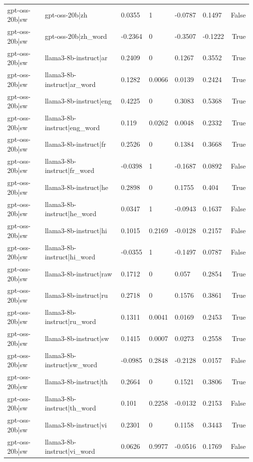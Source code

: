 \begin{table}
\begin{tabular}{llllllr}
gpt-oss-20b|sw & gpt-oss-20b|zh & 0.0355 & 1 & -0.0787 & 0.1497 & False \\
gpt-oss-20b|sw & gpt-oss-20b|zh_word & -0.2364 & 0 & -0.3507 & -0.1222 & True \\
gpt-oss-20b|sw & llama3-8b-instruct|ar & 0.2409 & 0 & 0.1267 & 0.3552 & True \\
gpt-oss-20b|sw & llama3-8b-instruct|ar_word & 0.1282 & 0.0066 & 0.0139 & 0.2424 & True \\
gpt-oss-20b|sw & llama3-8b-instruct|eng & 0.4225 & 0 & 0.3083 & 0.5368 & True \\
gpt-oss-20b|sw & llama3-8b-instruct|eng_word & 0.119 & 0.0262 & 0.0048 & 0.2332 & True \\
gpt-oss-20b|sw & llama3-8b-instruct|fr & 0.2526 & 0 & 0.1384 & 0.3668 & True \\
gpt-oss-20b|sw & llama3-8b-instruct|fr_word & -0.0398 & 1 & -0.1687 & 0.0892 & False \\
gpt-oss-20b|sw & llama3-8b-instruct|he & 0.2898 & 0 & 0.1755 & 0.404 & True \\
gpt-oss-20b|sw & llama3-8b-instruct|he_word & 0.0347 & 1 & -0.0943 & 0.1637 & False \\
gpt-oss-20b|sw & llama3-8b-instruct|hi & 0.1015 & 0.2169 & -0.0128 & 0.2157 & False \\
gpt-oss-20b|sw & llama3-8b-instruct|hi_word & -0.0355 & 1 & -0.1497 & 0.0787 & False \\
gpt-oss-20b|sw & llama3-8b-instruct|raw & 0.1712 & 0 & 0.057 & 0.2854 & True \\
gpt-oss-20b|sw & llama3-8b-instruct|ru & 0.2718 & 0 & 0.1576 & 0.3861 & True \\
gpt-oss-20b|sw & llama3-8b-instruct|ru_word & 0.1311 & 0.0041 & 0.0169 & 0.2453 & True \\
gpt-oss-20b|sw & llama3-8b-instruct|sw & 0.1415 & 0.0007 & 0.0273 & 0.2558 & True \\
gpt-oss-20b|sw & llama3-8b-instruct|sw_word & -0.0985 & 0.2848 & -0.2128 & 0.0157 & False \\
gpt-oss-20b|sw & llama3-8b-instruct|th & 0.2664 & 0 & 0.1521 & 0.3806 & True \\
gpt-oss-20b|sw & llama3-8b-instruct|th_word & 0.101 & 0.2258 & -0.0132 & 0.2153 & False \\
gpt-oss-20b|sw & llama3-8b-instruct|vi & 0.2301 & 0 & 0.1158 & 0.3443 & True \\
gpt-oss-20b|sw & llama3-8b-instruct|vi_word & 0.0626 & 0.9977 & -0.0516 & 0.1769 & False \\

\end{tabular}
\end{table}
